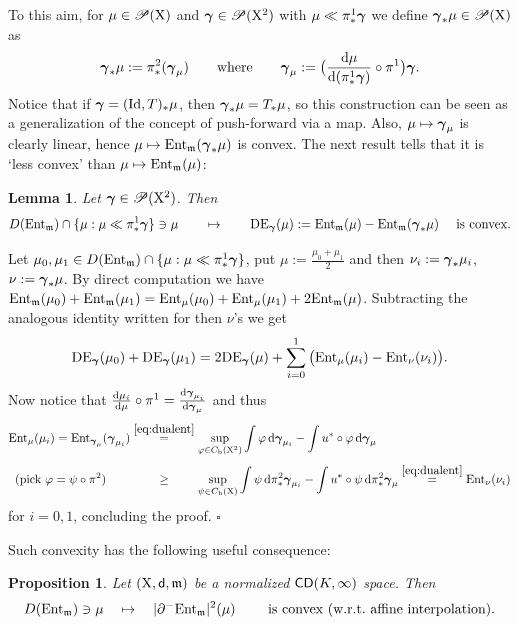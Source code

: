 \documentclass[11pt]{article}
\numberwithin{equation}{section}
\newtheorem{lemma}[theorem]{Lemma}
\newtheorem{proposition}[theorem]{Proposition}
\newenvironment{idea}{\removelastskip\par\medskip   %
\noindent{\em Idea of the proof} \rm}{\penalty-20\null\hfill$\square$\par\medbreak}
\newcommand{\ggamma}{{\mbox{\boldmath$\gamma$}}}
\newcommand{\sggamma}{{\mbox{\scriptsize\boldmath$\gamma$}}}
\newcommand{\pr}{\mathscr P}
\newcommand{\X}{{\rm X}}
\newcommand{\sfd}{{\sf d}}
\newcommand{\mm}{{\mathfrak m}}
\newcommand{\CD}{{\sf CD}}
\newcommand{\ent}{{\rm Ent}_\mm}
\newcommand{\entm}[1]{{\rm Ent}_{#1}}
\renewcommand{\d}{{\rm d}}
\renewcommand{\b}{{\rm b}}
\newcommand{\Id}{{\rm Id}}
\begin{document}
To this aim, for $\mu\in\pr (\X)$ and $\ggamma\in\pr(\X^2)$ with $\mu\ll\pi^1_*\ggamma$ we define $\ggamma_*\mu\in\pr(\X)$ as
\begin{equation}
\label{eq:gammapf}
\ggamma_*\mu:=\pi^2_*(\ggamma_\mu)\qquad\text{where}\qquad \ggamma_\mu:=\big(\frac{\d\mu}{\d(\pi^1_*\ggamma)}\circ\pi^1\big)\ggamma.
\end{equation}
Notice that if $\ggamma=(\Id,T)_*\mu$, then $\ggamma_*\mu=T_*\mu$, so this construction can be seen as a generalization of the concept of push-forward via a map. Also, $\mu\mapsto\ggamma_\mu$ is clearly linear, hence $\mu\mapsto \ent(\ggamma_*\mu)$ is convex. The next result tells that it is `less convex' than $\mu\mapsto\ent(\mu)$:
\begin{lemma}\label{le:convDE} Let $\ggamma\in\pr(\X^2)$. Then 
\[
D(\ent)\cap\{\mu:\mu\ll\pi^1_*\ggamma\}\ni \mu\qquad\mapsto\qquad {\rm DE}_\sggamma(\mu):= \ent(\mu)-\ent (\ggamma_*\mu)\quad\text{ is convex.} 
\]
\end{lemma} 
\begin{idea}
Let $\mu_0,\mu_1\in D(\ent)\cap\{\mu:\mu\ll\pi^1_*\ggamma\}$, put $\mu:=\frac{\mu_0+\mu_1}{2}$ and then $\nu_i:=\ggamma_*\mu_i$, $\nu:=\ggamma_*\mu$. By direct computation we have $
\ent(\mu_0)+\ent(\mu_1)=\entm\mu(\mu_0)+\entm\mu(\mu_1)+2\ent(\mu)$.
Subtracting the analogous identity written for then $\nu$'s we get
\[
{\rm DE}_\sggamma(\mu_0)+{\rm DE}_\sggamma(\mu_1)=2{\rm DE}_\sggamma(\mu)+\sum_{i=0}^1\big(\entm\mu(\mu_i)-\entm\nu(\nu_i)\big).
\]
Now notice that $\frac{\d\mu_i}{\d\mu}\circ\pi^1=\frac{\d \sggamma_{\mu_i}}{\d\sggamma_\mu}$ and thus
\[
\begin{split}
\entm{\mu}(\mu_i)=\entm{\sggamma_\mu}(\ggamma_{\mu_i})&\stackrel{\eqref{eq:dualent}}=\sup_{\varphi\in C_\b(\X^2)}\int\varphi\,\d\ggamma_{\mu_i}-\int u^*\circ\varphi\,\d\ggamma_\mu
\\
\text{(pick $\varphi=\psi\circ\pi^2$)}\qquad&\stackrel{\phantom{\eqref{eq:dualent}}}\geq \sup_{ \psi\in C_\b(\X)}\int\psi\,\d\pi^2_*\ggamma_{\mu_i}-\int u^*\circ\psi\,\d\pi^2_*\ggamma_\mu\stackrel{\eqref{eq:dualent}}=\entm{\nu}(\nu_i)
\end{split}
\]
for $i=0,1$, concluding the proof.
\end{idea}
Such convexity has the following useful consequence:
\begin{proposition}\label{prop:convsl}
Let $(\X,\sfd,\mm)$ be a normalized $\CD(K,\infty)$ space. Then 
\[
D(\ent)\ni \mu\quad\mapsto\quad|\partial^-\ent|^2(\mu)\qquad\text{ is convex (w.r.t.\ affine interpolation).}
\]
\end{proposition}
\end{document}
